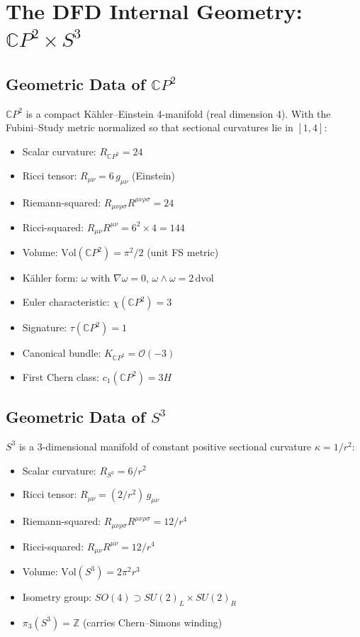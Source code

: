 \documentclass[12pt,a4paper]{article}
\begin{document}
\section{The DFD Internal Geometry: $\mathbb{C}P^2 \times S^3$}
\label{sec:dfd-geometry}

\subsection{Geometric Data of $\mathbb{C}P^2$}

$\mathbb{C}P^2$ is a compact K\"ahler--Einstein 4-manifold (real dimension 4).
With the Fubini--Study metric normalized so that sectional curvatures lie in
$[1,4]$:

\begin{itemize}[nosep]
\item Scalar curvature: $R_{\mathbb{C}P^2} = 24$
\item Ricci tensor: $R_{\mu\nu} = 6\,g_{\mu\nu}$ (Einstein)
\item Riemann-squared: $R_{\mu\nu\rho\sigma}R^{\mu\nu\rho\sigma} = 24$
\item Ricci-squared: $R_{\mu\nu}R^{\mu\nu} = 6^2 \times 4 = 144$
\item Volume: $\mathrm{Vol}(\mathbb{C}P^2) = \pi^2/2$ (unit FS metric)
\item K\"ahler form: $\omega$ with $\nabla\omega = 0$, $\omega \wedge \omega = 2\,\mathrm{dvol}$
\item Euler characteristic: $\chi(\mathbb{C}P^2) = 3$
\item Signature: $\tau(\mathbb{C}P^2) = 1$
\item Canonical bundle: $K_{\mathbb{C}P^2} = \mathcal{O}(-3)$
\item First Chern class: $c_1(\mathbb{C}P^2) = 3H$
\end{itemize}

\subsection{Geometric Data of $S^3$}

$S^3$ is a 3-dimensional manifold of constant positive sectional curvature
$\kappa = 1/r^2$:

\begin{itemize}[nosep]
\item Scalar curvature: $R_{S^3} = 6/r^2$
\item Ricci tensor: $R_{\mu\nu} = (2/r^2)\,g_{\mu\nu}$
\item Riemann-squared: $R_{\mu\nu\rho\sigma}R^{\mu\nu\rho\sigma} = 12/r^4$
\item Ricci-squared: $R_{\mu\nu}R^{\mu\nu} = 12/r^4$
\item Volume: $\mathrm{Vol}(S^3) = 2\pi^2 r^3$
\item Isometry group: $SO(4) \supset SU(2)_L \times SU(2)_R$
\item $\pi_3(S^3) = \mathbb{Z}$ (carries Chern--Simons winding)
\end{itemize}
\end{document}
